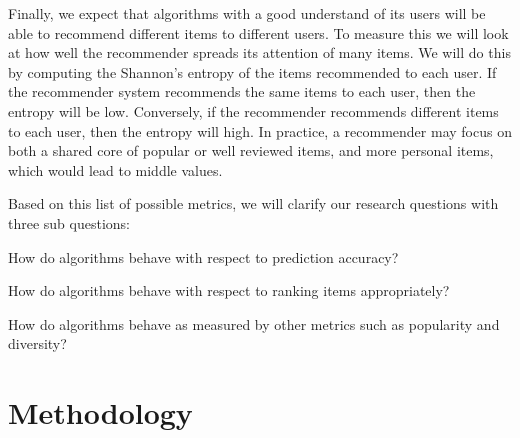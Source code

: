 \documentclass[letterpaper]{sig-alternate}
\begin{document}
  Finally, we expect that algorithms with a good understand of its users will be able to recommend different items to different users.
  To measure this we will look at how well the recommender spreads its attention of many items.
  We will do this by computing the Shannon's entropy of the items recommended to each user.
  If the recommender system recommends the same items to each user, then the entropy will be low.
  Conversely, if the recommender recommends different items to each user, then the entropy will high.
  In practice, a recommender may focus on both a shared core of popular or well reviewed items, and more personal items, which would lead to middle values.
  
  Based on this list of possible metrics, we will clarify our research questions with three sub questions:
  \begin{\itemize}
  \item How do algorithms behave with respect to prediction accuracy?
  \item How do algorithms behave with respect to ranking items appropriately?
  \item How do algorithms behave as measured by other metrics such as popularity and diversity?
  \end{\itemize}

  






\section{Methodology}
\label{sec:methodology}
\end{document}
